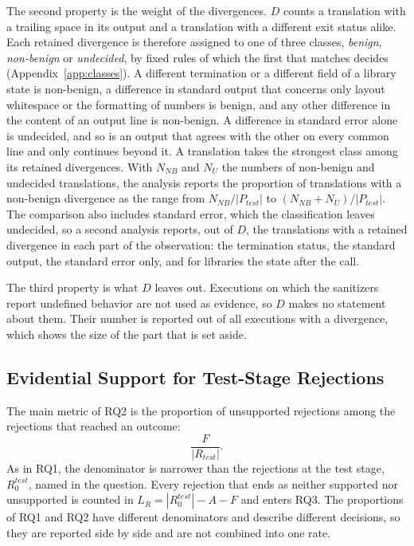 The second property is the weight of the divergences. $D$ counts a translation with a trailing space in its output and a translation with a different exit status alike. Each retained divergence is therefore assigned to one of three classes, \emph{benign}, \emph{non-benign} or \emph{undecided}, by fixed rules of which the first that matches decides (Appendix~\ref{app:classes}). A different termination or a different field of a library state is non-benign, a difference in standard output that concerns only layout whitespace or the formatting of numbers is benign, and any other difference in the content of an output line is non-benign. A difference in standard error alone is undecided, and so is an output that agrees with the other on every common line and only continues beyond it. A translation takes the strongest class among its retained divergences. With $N_{\mathit{NB}}$ and $N_{\mathit{U}}$ the numbers of non-benign and undecided translations, the analysis reports the proportion of translations with a non-benign divergence as the range from $N_{\mathit{NB}}/|P_{\mathit{test}}|$ to $(N_{\mathit{NB}}+N_{\mathit{U}})/|P_{\mathit{test}}|$. The comparison also includes standard error, which the classification leaves undecided, so a second analysis reports, out of $D$, the translations with a retained divergence in each part of the observation: the termination status, the standard output, the standard error only, and for libraries the state after the call.

The third property is what $D$ leaves out. Executions on which the sanitizers report undefined behavior are not used as evidence, so $D$ makes no statement about them. Their number is reported out of all executions with a divergence, which shows the size of the part that is set aside.

\subsection{Evidential Support for Test-Stage Rejections}\label{sec:m-rq2}

The main metric of RQ2 is the proportion of unsupported rejections among the rejections that reached an outcome:
\begin{equation}
\frac{F}{|R_{\mathit{test}}|}.
\end{equation}
As in RQ1, the denominator is narrower than the rejections at the test stage, $R_0^{\mathit{test}}$, named in the question. Every rejection that ends as neither supported nor unsupported is counted in $L_R = |R_0^{\mathit{test}}| - A - F$ and enters RQ3. The proportions of RQ1 and RQ2 have different denominators and describe different decisions, so they are reported side by side and are not combined into one rate.

